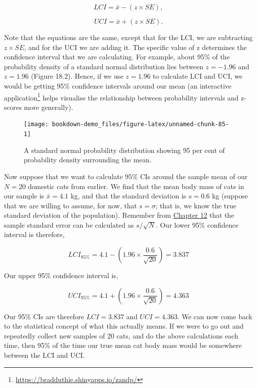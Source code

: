 \documentclass[
]{scrbook}
\begin{document}
\[LCI = \bar{x} - (z \times SE),\]

\[UCI = \bar{x} + (z \times SE).\]

Note that the equations are the same, except that for the LCI, we are subtracting \(z \times SE\), and for the UCI we are adding it.
The specific value of z determines the confidence interval that we are calculating.
For example, about 95\% of the probability density of a standard normal distribution lies between \(z = -1.96\) and \(z = 1.96\) (Figure 18.2).
Hence, if we use \(z = 1.96\) to calculate LCI and UCI, we would be getting 95\% confidence intervals around our mean (an interactive application\footnote{\url{https://bradduthie.shinyapps.io/zandp/}} helps visualise the relationship between probability intervals and z-scores more generally).

\begin{figure}
\texttt{[image: bookdown-demo\_files/figure-latex/unnamed-chunk-85-1]} \caption{A standard normal probability distribution showing 95 per cent of probability density surrounding the mean.}\label{fig:unnamed-chunk-85}
\end{figure}

Now suppose that we want to calculate 95\% CIs around the sample mean of our \(N = 20\) domestic cats from earlier.
We find that the mean body mass of cats in our sample is \(\bar{x} = 4.1\) kg, and that the standard deviation is \(s = 0.6\) kg (suppose that we are willing to assume, for now, that \(s = \sigma\); that is, we know the true standard deviation of the population).
Remember from \protect\hyperlink{Chapter_12}{Chapter 12} that the sample standard error can be calculated as \(s / \sqrt{N}\).
Our lower 95\% confidence interval is therefore,

\[LCI_{95\%} = 4.1 - \left(1.96 \times \frac{0.6}{\sqrt{20}}\right) = 3.837\]

Our upper 95\% confidence interval is,

\[UCI_{95\%} = 4.1 + \left(1.96 \times \frac{0.6}{\sqrt{20}}\right) = 4.363\]

Our 95\% CIs are therefore \(LCI = 3.837\) and \(UCI = 4.363\).
We can now come back to the statistical concept of what this actually means.
If we were to go out and repeatedly collect new samples of 20 cats, and do the above calculations each time, then 95\% of the time our true mean cat body mass would be somewhere between the LCI and UCI.
\end{document}
